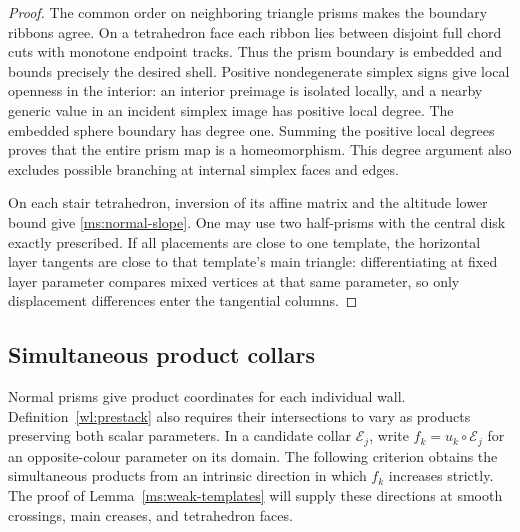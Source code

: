 \begin{proof}
The common order on neighboring triangle prisms makes the boundary
ribbons agree.  On a tetrahedron face each ribbon lies between
disjoint full chord cuts with monotone endpoint tracks.  Thus the
prism boundary is embedded and bounds precisely the desired shell.
Positive nondegenerate simplex signs give local openness in the
interior: an interior preimage is isolated locally, and a nearby
generic value in an incident simplex image has positive local
degree.  The embedded sphere boundary has degree one.  Summing
the positive local degrees proves that the entire prism map is a
homeomorphism.  This degree argument also excludes possible
branching at internal simplex faces and edges.

On each stair tetrahedron, inversion of its affine matrix and the
altitude lower bound give \eqref{ms:normal-slope}.  One may use two
half-prisms with the central disk exactly prescribed.  If all
placements are close to one template, the horizontal layer
tangents are close to that template's main triangle: differentiating
at fixed layer parameter compares mixed vertices at that same
parameter, so only displacement differences enter the tangential
columns.
\end{proof}

\subsection{Simultaneous product collars}

Normal prisms give product coordinates for each individual wall.
Definition~\ref{wl:prestack} also requires their intersections to vary
as products preserving both scalar parameters.  In a candidate collar
$\mathcal E_j$, write $f_k=u_k\circ\mathcal E_j$ for an
opposite-colour parameter on its domain.  The following criterion
obtains the simultaneous products from an intrinsic direction in which
$f_k$ increases strictly.  The proof of Lemma~\ref{ms:weak-templates}
will supply these directions at smooth crossings, main creases, and
tetrahedron faces.

